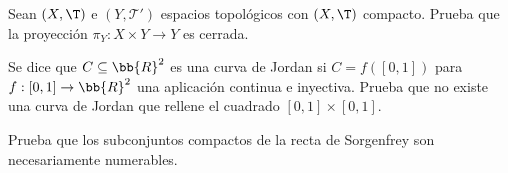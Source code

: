\begin{ejercicio}
    Sean $(X, \T)$ e $(Y, \mathcal{T'})$ espacios topológicos con $(X, \T)$ compacto. Prueba que la proyección $\pi_Y: X \times Y \to Y$ es cerrada.
\end{ejercicio}

\begin{ejercicio}
    Se dice que $C \subseteq \bb{R}^2$ es una curva de Jordan si $C = f([0, 1])$ para $f: [0, 1] \to \bb{R}^2$ una aplicación continua e inyectiva. Prueba que no existe una curva de Jordan que rellene el cuadrado $[0, 1] \times [0, 1]$.
\end{ejercicio}

\begin{ejercicio}
    Prueba que los subconjuntos compactos de la recta de Sorgenfrey son necesariamente numerables.
\end{ejercicio}